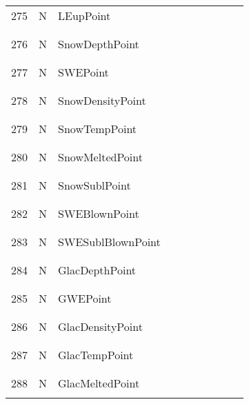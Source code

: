 \begin{longtable}{|c|c|l|c|c|c|c|p{}|c|p{}|}
275 & N & LEupPoint & & & & & & & \\
&&&&&&&&&\\\hline%
&&&&&&&&&\\
276 & N & SnowDepthPoint & & & & & & & \\
&&&&&&&&&\\\hline%
&&&&&&&&&\\
277 & N & SWEPoint & & & & & & & \\
&&&&&&&&&\\\hline%
&&&&&&&&&\\
278 & N & SnowDensityPoint & & & & & & & \\
&&&&&&&&&\\\hline%
&&&&&&&&&\\
279 & N & SnowTempPoint & & & & & & & \\
&&&&&&&&&\\\hline%
&&&&&&&&&\\
280 & N & SnowMeltedPoint & & & & & & & \\
&&&&&&&&&\\\hline%
&&&&&&&&&\\
281 & N & SnowSublPoint & & & & & & & \\
&&&&&&&&&\\\hline%
&&&&&&&&&\\
282 & N & SWEBlownPoint & & & & & & & \\
&&&&&&&&&\\\hline%
&&&&&&&&&\\
283 & N & SWESublBlownPoint & & & & & & & \\
&&&&&&&&&\\\hline%
&&&&&&&&&\\
284 & N & GlacDepthPoint & & & & & & & \\
&&&&&&&&&\\\hline%
&&&&&&&&&\\
285 & N & GWEPoint & & & & & & & \\
&&&&&&&&&\\\hline%
&&&&&&&&&\\
286 & N & GlacDensityPoint & & & & & & & \\
&&&&&&&&&\\\hline%
&&&&&&&&&\\
287 & N & GlacTempPoint & & & & & & & \\
&&&&&&&&&\\\hline%
&&&&&&&&&\\
288 & N & GlacMeltedPoint & & & & & & & \\
&&&&&&&&&\\\hline%

\end{longtable}
